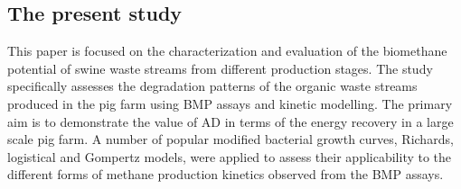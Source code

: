 \subsection{The present study}
This paper is focused on the characterization and evaluation of the biomethane potential of swine waste streams from different production stages. The study specifically assesses the degradation patterns of the organic waste streams produced in the pig farm using BMP assays and kinetic modelling. The primary aim is to demonstrate the value of AD in terms of the energy recovery in a large scale pig farm. A number of popular modified bacterial growth curves, Richards, logistical and Gompertz models, were applied to assess their applicability to the different forms of methane production kinetics observed from the BMP assays.